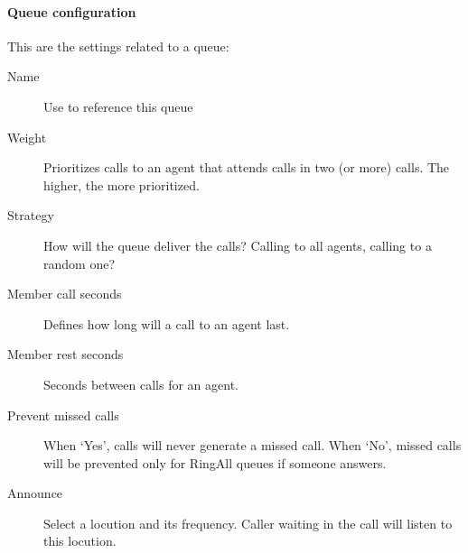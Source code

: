 \documentclass[letterpaper,10pt,english]{sphinxmanual}
\begin{document}
\paragraph{Queue configuration}
\label{administration_portal/client/vpbx/routing_endpoints/queues:queue-configuration}
This are the settings related to a queue:
\begin{description}
\item[{Name}] \leavevmode{}\label{administration_portal/client/vpbx/routing_endpoints/queues:term-name}
Use to reference this queue

\item[{Weight}] \leavevmode{}\label{administration_portal/client/vpbx/routing_endpoints/queues:term-weight}
Prioritizes calls to an agent that attends calls in two (or more) calls. The
higher, the more prioritized.

\item[{Strategy}] \leavevmode{}\label{administration_portal/client/vpbx/routing_endpoints/queues:term-strategy}
How will the queue deliver the calls? Calling to all agents, calling to a
random one?

\item[{Member call seconds}] \leavevmode{}\label{administration_portal/client/vpbx/routing_endpoints/queues:term-member-call-seconds}
Defines how long will a call to an agent last.

\item[{Member rest seconds}] \leavevmode{}\label{administration_portal/client/vpbx/routing_endpoints/queues:term-member-rest-seconds}
Seconds between calls for an agent.

\item[{Prevent missed calls}] \leavevmode{}\label{administration_portal/client/vpbx/routing_endpoints/queues:term-prevent-missed-calls}
When `Yes', calls will never generate a missed call. When `No', missed calls will be prevented only for RingAll
queues if someone answers.

\item[{Announce}] \leavevmode{}\label{administration_portal/client/vpbx/routing_endpoints/queues:term-announce}
Select a locution and its frequency. Caller waiting in the call will listen
to this locution.


\end{description}
\end{document}
